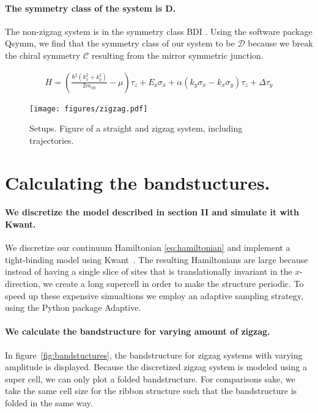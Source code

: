 \documentclass[english, twocolumn, 10pt, aps, superscriptaddress, floatfix, prb, citeautoscript]{revtex4-1}
\newcommand{\kx}{k_x}
\newcommand{\ky}{k_y}
\newcommand{\meff}{m_\text{eff}}
\renewcommand{\comment}[2]{#2}
\renewcommand{\comment}{\paragraph}
\begin{document}
\comment{The symmetry class of the system is D.}
The non-zigzag system is in the symmetry class BDI \cite{pientka2017topological}.
Using the software package Qsymm\cite{varjas2018qsymm}, we find that the symmetry class of our system to be $\mathcal{D}$ because we break the chiral symmetry $\mathcal{C}$ resulting from the mirror symmetric junction.

\begin{small}
\begin{align}
    H = \left(\frac{\hbar^2\left(\kx^2 + \ky^2\right)}{2\meff} - \mu\right)\tau_z+
        E_\text{z} \sigma_x+
        \alpha \left( \ky \sigma_x - \kx \sigma_y \right) \tau_z +
        \Delta \tau_y
\end{align}
\label{eq:hamiltonian}
\end{small}

\begin{figure}[!htb]
\texttt{[image: figures/zigzag.pdf]}
\caption{Setups. Figure of a straight and zigzag system, including trajectories.
\label{fig:setup}}
\end{figure}

\section{Calculating the bandstuctures.}

\comment{We discretize the model described in section II and simulate it with Kwant.}
We discretize our continuum Hamiltonian \eqref{eq:hamiltonian} and implement a tight-binding model using Kwant~\cite{groth_kwant:_2014}.
The resulting Hamiltonians are large because instead of having a single slice of sites that is translationally invariant in the $x$-direction, we create a long supercell in order to make the structure periodic.
To speed up these expensive simualtions we employ an adaptive sampling strategy, using the Python package Adaptive. %

\comment{We calculate the bandstructure for varying amount of zigzag.}
In figure~\ref{fig:bandstuctures}, the bandstructure for zigzag systems with varying amplitude is displayed.
Because the discretized zigzag system is modeled using a super cell, we can only plot a folded bandstructure.
For comparisons sake, we take the same cell size for the ribbon structure such that the bandstructure is folded in the same way.
\end{document}
